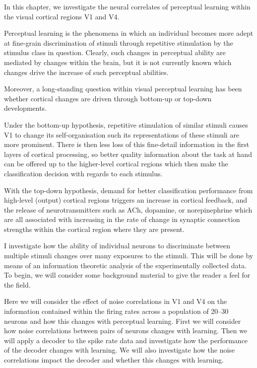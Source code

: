In this chapter, we investigate the neural correlates of perceptual learning within the visual cortical regions \ac{V1} and \ac{V4}.

Perceptual learning is the phenomena in which an individual becomes more adept at fine-grain discrimination of stimuli through repetitive stimulation by the stimulus class in question.
Clearly, such changes in perceptual ability are mediated by changes within the brain, but it is not currently known which changes drive the increase of such perceptual abilities.

Moreover, a long-standing question within visual perceptual learning has been whether cortical changes are driven through bottom-up or top-down developments.

Under the bottom-up hypothesis, repetitive stimulation of similar stimuli causes \ac{V1} to change its self-organisation such its representations of these stimuli are more prominent.
There is then less loss of this fine-detail information in the first layers of cortical processing, so better quality information about the task at hand can be offered up to the higher-level cortical regions which then make the classification decision with regards to each stimulus.

With the top-down hypothesis, demand for better classification performance from high-level (output) cortical regions triggers an increase in cortical feedback, and the release of neurotransmitters such as \ac{ACh}, dopamine, or norepinephrine which are all associated with increasing in the rate of change in synaptic connection strengths within the cortical region where they are present.


I investigate how the ability of individual neurons to discriminate between multiple stimuli changes over many exposures to the stimuli.
This will be done by means of an information theoretic analysis of the experimentally collected data.
To begin, we will consider some background material to give the reader a feel for the field.

Here we will consider the effect of noise correlations in \ac{V1} and \ac{V4} on the information contained within the firing rates across a population of 20--30 neurons and how this changes with perceptual learning.
First we will consider how noise correlations between pairs of neurons changes with learning.
Then we will apply a decoder to the spike rate data and investigate how the performance of the decoder changes with learning.
We will also investigate how the noise correlations impact the decoder and whether this changes with learning.

